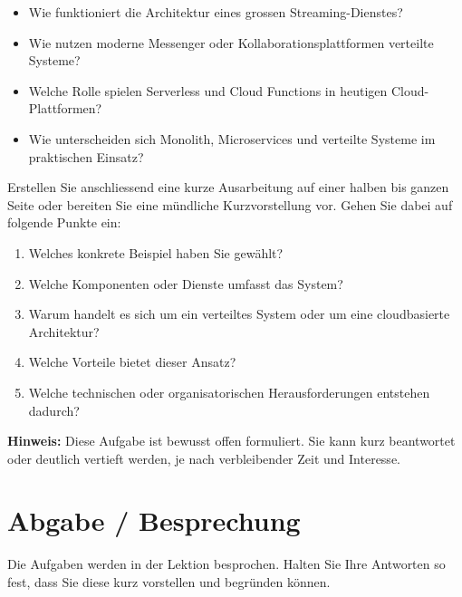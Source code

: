 \documentclass[11pt,a4paper]{article}
\begin{document}
\begin{itemize}
  \item Wie funktioniert die Architektur eines grossen Streaming-Dienstes?
  \item Wie nutzen moderne Messenger oder Kollaborationsplattformen verteilte Systeme?
  \item Welche Rolle spielen Serverless und Cloud Functions in heutigen Cloud-Plattformen?
  \item Wie unterscheiden sich Monolith, Microservices und verteilte Systeme im praktischen Einsatz?
\end{itemize}

Erstellen Sie anschliessend eine kurze Ausarbeitung auf einer halben bis ganzen Seite oder bereiten Sie eine m\"undliche Kurzvorstellung vor. Gehen Sie dabei auf folgende Punkte ein:

\begin{enumerate}
  \item Welches konkrete Beispiel haben Sie gew\"ahlt?
  \item Welche Komponenten oder Dienste umfasst das System?
  \item Warum handelt es sich um ein verteiltes System oder um eine cloudbasierte Architektur?
  \item Welche Vorteile bietet dieser Ansatz?
  \item Welche technischen oder organisatorischen Herausforderungen entstehen dadurch?
\end{enumerate}

\textbf{Hinweis:} Diese Aufgabe ist bewusst offen formuliert. Sie kann kurz beantwortet oder deutlich vertieft werden, je nach verbleibender Zeit und Interesse.

\section*{Abgabe / Besprechung}
Die Aufgaben werden in der Lektion besprochen. Halten Sie Ihre Antworten so fest, dass Sie diese kurz vorstellen und begr\"unden k\"onnen.
\end{document}
